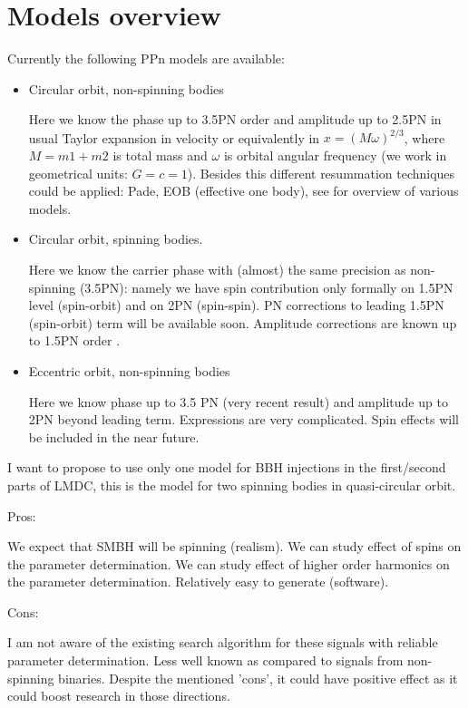 \documentclass[11pt]{report}
\begin{document}
\section{Models overview}
Currently the following PPn models are available:
\begin{itemize}
\item Circular orbit, non-spinning bodies

Here we know the phase up to 3.5PN order and amplitude up 
to 2.5PN in usual Taylor expansion in velocity or equivalently in
$x = (M\omega)^{2/3}$, where $M = m1+m2$ is total mass and 
$\omega$ is orbital angular frequency (we work in geometrical units:
$G=c=1$). Besides this different resummation techniques could be applied: Pade, EOB (effective one body), see \cite{BCV1} for overview
of various models.

\item Circular orbit, spinning bodies.

Here we know the carrier phase with (almost) the same precision
as non-spinning (3.5PN): namely we have spin contribution only 
formally on 1.5PN level (spin-orbit) and on 2PN (spin-spin). 
PN corrections to leading 1.5PN (spin-orbit) term will be available
 soon. Amplitude corrections are known up to 1.5PN order \cite{Kidder}.
 
 
 \item Eccentric orbit, non-spinning bodies
 
Here we know phase up to 3.5 PN (very recent result) and 
amplitude up to 2PN beyond leading term. Expressions are 
very complicated. Spin effects will be included in the near
future. 
 
\end{itemize}

I want to propose to use only one model for BBH injections
in the first/second parts of LMDC, this is the model for two
spinning bodies in quasi-circular orbit. 

Pros:

We expect that SMBH will be spinning (realism).
We can study effect of spins on the parameter determination.
We can study effect of higher order harmonics on the 
parameter determination. Relatively easy to generate (software).


Cons:

I am not aware of the existing search algorithm for these 
signals with reliable parameter determination. Less well known
as compared to signals from non-spinning binaries. 
Despite the mentioned 'cons', it could have positive effect as 
it could boost research in those directions.
\end{document}
